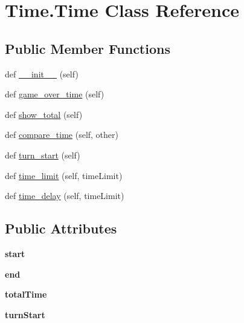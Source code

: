\hypertarget{class_time_1_1_time}{}\section{Time.\+Time Class Reference}
\label{class_time_1_1_time}
\subsection*{Public Member Functions}
\begin{DoxyCompactItemize}
\item 
def \hyperlink{class_time_1_1_time_a2fcd7309de0e40d3550b6fd97c2551bc}{\+\_\+\+\_\+init\+\_\+\+\_\+} (self)
\item 
def \hyperlink{class_time_1_1_time_aafb2c5f50e604069848cf5dea89a0594}{game\+\_\+over\+\_\+time} (self)
\item 
def \hyperlink{class_time_1_1_time_aaf3b423ec6a81c3737a01b89e76051b0}{show\+\_\+total} (self)
\item 
def \hyperlink{class_time_1_1_time_ae62071f9db0a182d0ccc85bfbf8b2ebc}{compare\+\_\+time} (self, other)
\item 
def \hyperlink{class_time_1_1_time_abab694cc273962120aa1260e46634436}{turn\+\_\+start} (self)
\item 
def \hyperlink{class_time_1_1_time_a431f5589ccc49f1292dac1e7d9ac264f}{time\+\_\+limit} (self, time\+Limit)
\item 
def \hyperlink{class_time_1_1_time_ae284d02dadb90298689d4711a8c6f992}{time\+\_\+delay} (self, time\+Limit)
\end{DoxyCompactItemize}
\subsection*{Public Attributes}
\begin{DoxyCompactItemize}
\item 
\mbox{\label{class_time_1_1_time_a979714c0eb21ec0b20e5ba2e092b6579}} 
{\bfseries start}
\item 
\mbox{\label{class_time_1_1_time_a61b228c11c6bb3efef5ca1b432c841c0}} 
{\bfseries end}
\item 
\mbox{\label{class_time_1_1_time_afe5503bd50131699da71cb9ad56c530d}} 
{\bfseries total\+Time}
\item 
\mbox{\label{class_time_1_1_time_a2356f3a031befb638919910320e9ab8c}} 
{\bfseries turn\+Start}
\end{DoxyCompactItemize}


